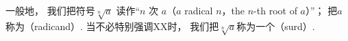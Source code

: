 一般地，
我们把符号\(\sqrt[n]{a}\)
读作“\(n\) 次 \(a\)（\(a\) radical \(n\)，the \(n\)-th root of \(a\)）”；
把\(a\)称为（radicand）.
当不必特别强调XX时，
我们把\(\sqrt[n]{a}\)称为一个（surd）.
